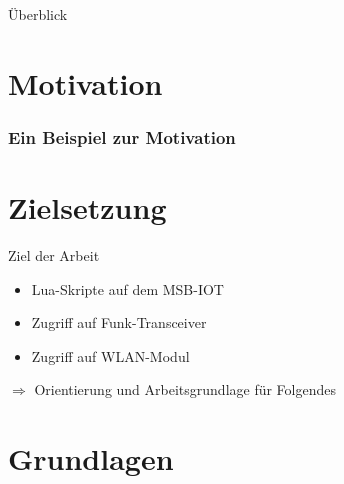 \documentclass[xcolor=svgnames]{beamer}
\newcommand*{\vspplus}{\vspace{\baselineskip}}
\begin{document}
\subject{Informatik}

\begin{frame}
  \titlepage
\end{frame}

\begin{frame}{Überblick}
\tableofcontents
\end{frame}

\section{Motivation}

\begin{frame}[fragile]
\frametitle{Ein Beispiel zur Motivation}

\simpleblink
\end{frame}


\section{Zielsetzung}


\begin{frame}{Ziel der Arbeit}
\begin{itemize}
\item Lua-Skripte auf dem MSB-IOT    
\item Zugriff auf Funk-Transceiver
\item Zugriff auf WLAN-Modul
\end{itemize}

\vspplus

\quad $\Rightarrow$ Orientierung und Arbeitsgrundlage für Folgendes
\end{frame}

\section{Grundlagen}
 
\end{document}

